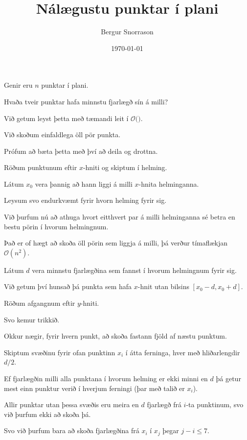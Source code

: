 \title{Nálægustu punktar í plani}
\author{Bergur Snorrason}
\date{\today}



\frame{\titlepage}

{
	{
		\item<1-> Genir eru $n$ punktar í plani.
		\item<2-> Hvaða tveir punktar hafa minnstu fjarlægð sín á milli?
		\item<3-> Við getum leyst þetta með tæmandi leit í $\mathcal{O}($\onslide<4->{$n^2$}$)$.
		\item<5-> Við skoðum einfaldlega öll pör punkta.
		\item<6-> Prófum að bæta þetta með því að deila og drottna.
	}
}

{
	{
		\item<1-> Röðum punktunum eftir $x$-hniti og skiptum í helming.
		\item<2-> Látum $x_0$ vera þannig að hann liggi á milli $x$-hnita helminganna.
		\item<3-> Leysum svo endurkvæmt fyrir hvorn helming fyrir sig.
		\item<4-> Við þurfum nú að athuga hvort eitthvert par á milli helminganna sé betra en
					bestu pörin í hvorum helmingnum.
		\item<5-> Það er of hægt að skoða öll pörin sem liggja á milli, þá verður tímaflækjan $\mathcal{O}(n^2)$.
		\item<6-> Látum $d$ vera minnstu fjarlægðina sem fannst í hvorum helmingnum fyrir sig.
		\item<7-> Við getum því hunsað þá punkta sem hafa $x$-hnit utan bilsins $[x_0 - d, x_0 + d]$.
		\item<8-> Röðum afgangnum eftir $y$-hniti.
		\item<9-> Svo kemur trikkið.
		\item<10-> Okkur nægir, fyrir hvern punkt, að skoða fastann fjöld af næstu punktum.
	}
}

{
	{
		\item<1-> Skiptum svæðinu fyrir ofan punktinn $x_i$ í átta ferninga, hver með hliðarlengdir $d/2$.
		\item<2-> Ef fjarlægðin milli alla punktana í hvorum helming er ekki minni en $d$ þá getur mest einn punktur verið í hverjum ferningi
					(þar með talið er $x_i$).
		\item<3-> Allir punktar utan þessa svæðis eru meira en $d$ fjarlægð frá $i$-ta punktinum, svo við þurfum ekki að skoða þá.
		\item<4-> Svo við þurfum bara að skoða fjarlægðina frá $x_i$ í $x_j$ þegar $j - i \leq 7$.
	}
}

